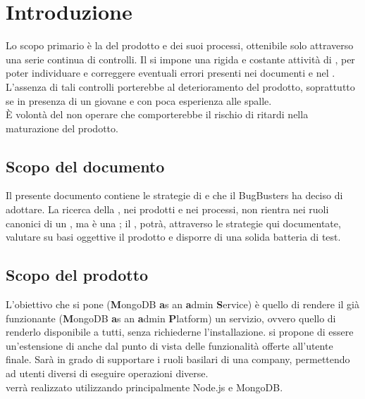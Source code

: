 \section{Introduzione}
Lo scopo primario è la  del prodotto e dei suoi processi, ottenibile solo attraverso una serie continua di controlli. Il  si impone una rigida e costante attività di , per poter individuare e correggere eventuali errori presenti nei documenti e nel . L'assenza di tali controlli porterebbe al deterioramento del prodotto, soprattutto se in presenza di un  giovane e con poca esperienza alle spalle. \\
È volontà del  non operare  che comporterebbe il rischio di ritardi nella maturazione del prodotto.

\subsection{Scopo del documento}
Il presente documento contiene le strategie di  e  che il  BugBusters ha deciso di adottare. La ricerca della , nei prodotti e nei processi, non rientra nei ruoli canonici di un , ma è una ; il , potrà, attraverso le strategie qui documentate, valutare su basi oggettive il prodotto e disporre di una solida batteria di test.

\subsection{Scopo del prodotto}
L'obiettivo che si pone  (\textbf{M}ongoDB \textbf{a}s an \textbf{a}dmin \textbf{S}ervice) è quello di rendere il già funzionante  (\textbf{M}ongoDB \textbf{a}s an \textbf{a}dmin \textbf{P}latform) un servizio, ovvero quello di renderlo disponibile a tutti, senza richiederne l'installazione.  si propone di essere un'estensione di  anche dal punto di vista delle funzionalità offerte all'utente finale. Sarà in grado di supportare i ruoli basilari di una company, permettendo ad utenti diversi di eseguire operazioni diverse. \\
 verrà realizzato utilizzando principalmente Node.js e MongoDB.

